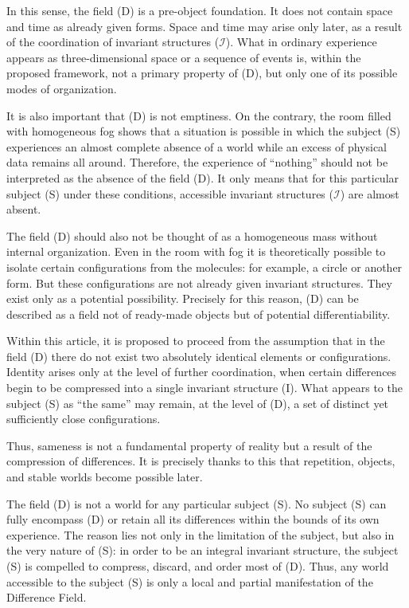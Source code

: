 \documentclass[aps,prd,onecolumn,nofootinbib,superscriptaddress]{revtex4-2}
\begin{document}
In this sense, the field (D) is a pre-object foundation. It does not contain space and time as already given forms. Space and time may arise only later, as a result of the coordination of invariant structures ($\mathcal{I}$). What in ordinary experience appears as three-dimensional space or a sequence of events is, within the proposed framework, not a primary property of (D), but only one of its possible modes of organization.

It is also important that (D) is not emptiness. On the contrary, the room filled with homogeneous fog shows that a situation is possible in which the subject (S) experiences an almost complete absence of a world while an excess of physical data remains all around. Therefore, the experience of “nothing” should not be interpreted as the absence of the field (D). It only means that for this particular subject (S) under these conditions, accessible invariant structures ($\mathcal{I}$) are almost absent.

The field (D) should also not be thought of as a homogeneous mass without internal organization. Even in the room with fog it is theoretically possible to isolate certain configurations from the molecules: for example, a circle or another form. But these configurations are not already given invariant structures. They exist only as a potential possibility. Precisely for this reason, (D) can be described as a field not of ready-made objects but of potential differentiability.

Within this article, it is proposed to proceed from the assumption that in the field (D) there do not exist two absolutely identical elements or configurations. Identity arises only at the level of further coordination, when certain differences begin to be compressed into a single invariant structure (I). What appears to the subject (S) as “the same” may remain, at the level of (D), a set of distinct yet sufficiently close configurations.

Thus, sameness is not a fundamental property of reality but a result of the compression of differences. It is precisely thanks to this that repetition, objects, and stable worlds become possible later.

The field (D) is not a world for any particular subject (S). No subject (S) can fully encompass (D) or retain all its differences within the bounds of its own experience. The reason lies not only in the limitation of the subject, but also in the very nature of (S): in order to be an integral invariant structure, the subject (S) is compelled to compress, discard, and order most of (D). Thus, any world accessible to the subject (S) is only a local and partial manifestation of the Difference Field.
\end{document}
